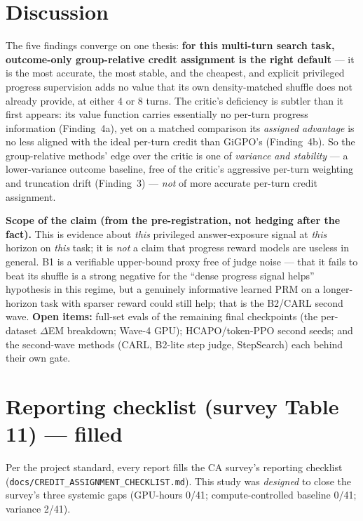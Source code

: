 \documentclass[11pt,a4paper]{article}
\begin{document}
\section{Discussion}

The five findings converge on one thesis: \textbf{for this multi-turn search task, outcome-only
group-relative credit assignment is the right default} --- it is the most accurate, the most
stable, and the cheapest, and explicit privileged progress supervision adds no value that its own
density-matched shuffle does not already provide, at either 4 or 8 turns. The critic's deficiency
is subtler than it first appears: its value function carries essentially no per-turn progress
information (Finding~4a), yet on a matched comparison its \emph{assigned advantage} is no less
aligned with the ideal per-turn credit than GiGPO's (Finding~4b). So the group-relative methods'
edge over the critic is one of \emph{variance and stability} --- a lower-variance outcome baseline,
free of the critic's aggressive per-turn weighting and truncation drift (Finding~3) --- \emph{not}
of more accurate per-turn credit assignment.

\textbf{Scope of the claim (from the pre-registration, not hedging after the fact).} This is
evidence about \emph{this} privileged answer-exposure signal at \emph{this} horizon on \emph{this}
task; it is \emph{not} a claim that progress reward models are useless in general. B1 is a
verifiable upper-bound proxy free of judge noise --- that it fails to beat its shuffle is a strong
negative for the ``dense progress signal helps'' hypothesis in this regime, but a genuinely
informative learned PRM on a longer-horizon task with sparser reward could still help; that is the
B2/CARL second wave. \textbf{Open items:} full-set evals of the remaining final checkpoints (the
per-dataset $\Delta$EM breakdown; Wave-4 GPU); HCAPO/token-PPO second seeds; and the second-wave
methods (CARL, B2-lite step judge, StepSearch) each behind their own gate.

\clearpage
\appendix

\section{Reporting checklist (survey Table 11) --- filled}

Per the project standard, every report fills the CA survey's reporting checklist
(\texttt{docs/CREDIT\_ASSIGNMENT\_CHECKLIST.md}). This study was \emph{designed} to close the
survey's three systemic gaps (GPU-hours 0/41; compute-controlled baseline 0/41; variance 2/41).
\end{document}
